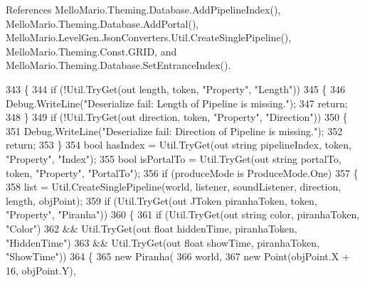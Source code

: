 References Mello\+Mario.\+Theming.\+Database.\+Add\+Pipeline\+Index(), Mello\+Mario.\+Theming.\+Database.\+Add\+Portal(), Mello\+Mario.\+Level\+Gen.\+Json\+Converters.\+Util.\+Create\+Single\+Pipeline(), Mello\+Mario.\+Theming.\+Const.\+G\+R\+ID, and Mello\+Mario.\+Theming.\+Database.\+Set\+Entrance\+Index().


\begin{DoxyCode}
343         \{
344             \textcolor{keywordflow}{if} (!Util.TryGet(out length, token, \textcolor{stringliteral}{"Property"}, \textcolor{stringliteral}{"Length"}))
345             \{
346                 Debug.WriteLine(\textcolor{stringliteral}{"Deserialize fail: Length of Pipeline is missing."});
347                 \textcolor{keywordflow}{return};
348             \}
349             \textcolor{keywordflow}{if} (!Util.TryGet(out direction, token, \textcolor{stringliteral}{"Property"}, \textcolor{stringliteral}{"Direction"}))
350             \{
351                 Debug.WriteLine(\textcolor{stringliteral}{"Deserialize fail: Direction of Pipeline is missing."});
352                 \textcolor{keywordflow}{return};
353             \}
354             \textcolor{keywordtype}{bool} hasIndex = Util.TryGet(out \textcolor{keywordtype}{string} pipelineIndex, token, \textcolor{stringliteral}{"Property"}, \textcolor{stringliteral}{"Index"});
355             \textcolor{keywordtype}{bool} isPortalTo = Util.TryGet(out \textcolor{keywordtype}{string} portalTo, token, \textcolor{stringliteral}{"Property"}, \textcolor{stringliteral}{"PortalTo"});
356             \textcolor{keywordflow}{if} (produceMode is ProduceMode.One)
357             \{
358                 list = Util.CreateSinglePipeline(world, listener, soundListener, direction, length, 
      objPoint);
359                 \textcolor{keywordflow}{if} (Util.TryGet(out JToken piranhaToken, token, \textcolor{stringliteral}{"Property"}, \textcolor{stringliteral}{"Piranha"}))
360                 \{
361                     \textcolor{keywordflow}{if} (Util.TryGet(out \textcolor{keywordtype}{string} color, piranhaToken, \textcolor{stringliteral}{"Color"})
362                         && Util.TryGet(out \textcolor{keywordtype}{float} hiddenTime, piranhaToken, \textcolor{stringliteral}{"HiddenTime"})
363                         && Util.TryGet(out \textcolor{keywordtype}{float} showTime, piranhaToken, \textcolor{stringliteral}{"ShowTime"}))
364                     \{
365                         \textcolor{keyword}{new} Piranha(
366                             world,
367                             \textcolor{keyword}{new} Point(objPoint.X + 16, objPoint.Y),

\end{DoxyCode}
